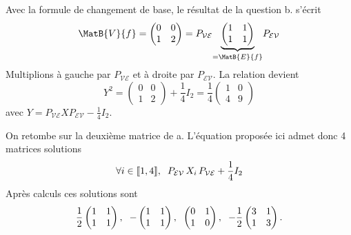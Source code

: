 \begin{enumerate}
Avec la formule de changement de base, le résultat de la question b. s'écrit
\[
\MatB{V}{f}=
\begin{pmatrix} 0 & 0 \\ 1 & 2 \end{pmatrix}
 = P_{\mathcal{V}\mathcal{E}} \underset{= \MatB{E}{f}}{\underbrace{\begin{pmatrix} 1 & 1 \\ 1 & 1 \end{pmatrix}}}P_{\mathcal{E}\mathcal{V}} 
\]
Multiplions à gauche par $P_{\mathcal{V}\mathcal{E}}$ et à droite par $P_{\mathcal{E}\mathcal{V}}$. La relation devient
\[
  Y^2 = \begin{pmatrix} 0 & 0 \\ 1 & 2 \end{pmatrix} + \frac{1}{4} I_2 = \frac{1}{4}\begin{pmatrix} 1 & 0 \\ 4 & 9 \end{pmatrix}  
\]
avec $Y = P_{\mathcal{V}\mathcal{E}} X P_{\mathcal{E}\mathcal{V}} - \frac{1}{4}I_2$.
\end{enumerate}
On retombe sur la deuxième matrice de a. L'équation proposée ici admet donc 4 matrices solutions
\[
  \forall i \in \llbracket 1,4 \rrbracket, \hspace{0.2cm} P_{\mathcal{E}\mathcal{V}}\, X_i\, P_{\mathcal{V}\mathcal{E}} + \frac{1}{4} I_2
\]
Après calculs ces solutions sont
\[
  \frac{1}{2}\begin{pmatrix} 1 & 1 \\ 1 & 1 \end{pmatrix},\hspace{0.2cm}
  -\begin{pmatrix} 1 & 1 \\ 1 & 1 \end{pmatrix},\hspace{0.2cm}
  \begin{pmatrix} 0 & 1 \\ 1 & 0 \end{pmatrix},\hspace{0.2cm}
  -\frac{1}{2}\begin{pmatrix} 3 & 1 \\ 1 & 3 \end{pmatrix}.
\]
